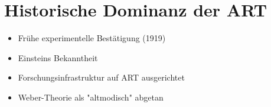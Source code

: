 \section{Historische Dominanz der ART}
\begin{itemize}
\item Frühe experimentelle Bestätigung (1919)
\item Einsteins Bekanntheit
\item Forschungsinfrastruktur auf ART ausgerichtet
\item Weber-Theorie als "altmodisch" abgetan
\end{itemize}